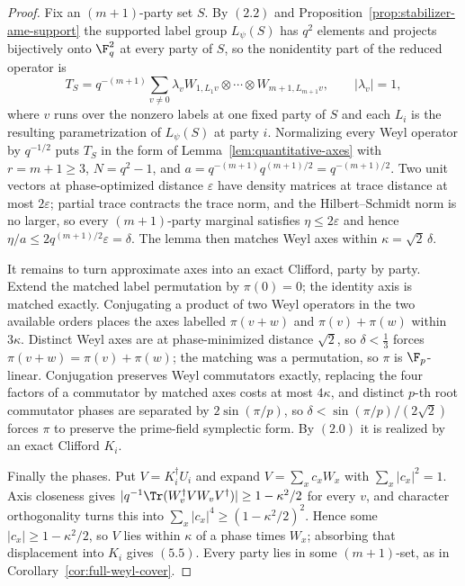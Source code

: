\begin{proof}
Fix an \((m+1)\)-party set \(S\).  By \((2.2)\) and
Proposition~\ref{prop:stabilizer-ame-support} the supported label group
\(L_\psi(S)\) has \(q^2\) elements and projects bijectively onto
\(\F_q^2\) at every party of \(S\), so the nonidentity part of the reduced
operator is
\[
 T_S=q^{-(m+1)}\sum_{v\ne0}\lambda_v
   W_{1,L_1v}\otimes\cdots\otimes W_{m+1,L_{m+1}v},
 \qquad\lvert\lambda_v\rvert=1,
\]
where \(v\) runs over the nonzero labels at one fixed party of \(S\) and
each \(L_i\) is the resulting parametrization of \(L_\psi(S)\) at party
\(i\).  Normalizing every Weyl operator by \(q^{-1/2}\) puts \(T_S\) in the
form of Lemma~\ref{lem:quantitative-axes} with
\(r=m+1\geq3\), \(N=q^2-1\), and
\(a=q^{-(m+1)}q^{(m+1)/2}=q^{-(m+1)/2}\).  Two
unit vectors at phase-optimized distance \(\varepsilon\) have density
matrices at trace distance at most \(2\varepsilon\); partial trace
contracts the trace norm, and the Hilbert--Schmidt norm is no larger, so
every \((m+1)\)-party marginal satisfies \(\eta\leq2\varepsilon\) and hence
\(\eta/a\leq2q^{(m+1)/2}\varepsilon=\delta\).  The lemma then matches Weyl
axes within \(\kappa=\sqrt2\,\delta\).

It remains to turn approximate axes into an exact Clifford, party by party.
Extend the matched label permutation by \(\pi(0)=0\); the identity axis is
matched exactly.  Conjugating a product of two Weyl operators in the two
available orders places the axes labelled \(\pi(v+w)\) and
\(\pi(v)+\pi(w)\) within \(3\kappa\).  Distinct Weyl axes are at
phase-minimized distance \(\sqrt2\), so \(\delta<\frac13\) forces
\(\pi(v+w)=\pi(v)+\pi(w)\); the matching was a permutation, so \(\pi\) is
\(\F_p\)-linear.  Conjugation preserves Weyl commutators exactly, replacing
the four factors of a commutator by matched axes costs at most
\(4\kappa\), and distinct \(p\)-th root commutator phases are separated by
\(2\sin(\pi/p)\), so \(\delta<\sin(\pi/p)/(2\sqrt2)\) forces \(\pi\) to
preserve the prime-field symplectic form.  By \((2.0)\) it is realized by
an exact Clifford \(K_i\).

Finally the phases.  Put \(V=K_i^\dagger U_i\) and expand
\(V=\sum_xc_xW_x\) with \(\sum_x\lvert c_x\rvert^2=1\).  Axis closeness
gives \(\lvert q^{-1}\Tr(W_v^\dagger VW_vV^\dagger)\rvert\geq
1-\kappa^2/2\) for every \(v\), and character orthogonality turns this into
\(\sum_x\lvert c_x\rvert^4\geq(1-\kappa^2/2)^2\).  Hence some
\(\lvert c_x\rvert\geq1-\kappa^2/2\), so \(V\) lies within \(\kappa\) of a
phase times \(W_x\); absorbing that displacement into \(K_i\) gives
\((5.5)\).  Every party lies in some \((m+1)\)-set, as in
Corollary~\ref{cor:full-weyl-cover}.
\end{proof}

